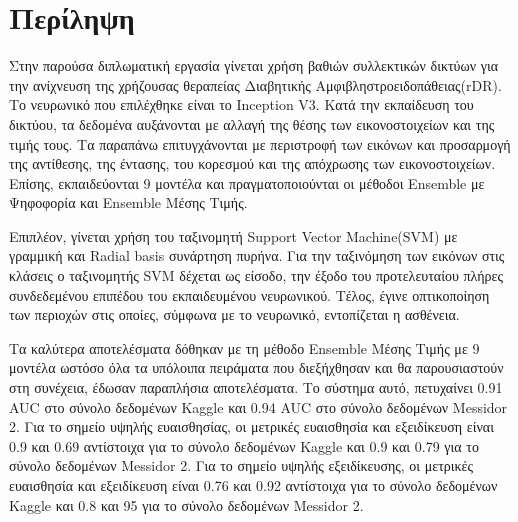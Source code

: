 \pagestyle{plain}

\chapter*{Περίληψη}
Στην παρούσα διπλωματική εργασία γίνεται χρήση βαθιών συλλεκτικών δικτύων για την ανίχνευση της χρήζουσας θεραπείας Διαβητικής Αμφιβληστροειδοπάθειας(rDR). Το νευρωνικό που επιλέχθηκε είναι το Inception V3. Κατά την εκπαίδευση του δικτύου, τα δεδομένα αυξάνονται με αλλαγή της θέσης των εικονοστοιχείων και της τιμής τους. Τα παραπάνω επιτυγχάνονται με περιστροφή των εικόνων και προσαρμογή της αντίθεσης, της έντασης, του κορεσμού και της απόχρωσης των εικονοστοιχείων. 
Επίσης, εκπαιδεύονται 9 μοντέλα και πραγματοποιούνται οι μέθοδοι Ensemble με Ψηφοφορία και Ensemble Μέσης Τιμής. 

Επιπλέον, γίνεται χρήση του ταξινομητή Support Vector Machine(SVM) με γραμμική και Radial basis συνάρτηση πυρήνα. Για την ταξινόμηση των εικόνων στις κλάσεις ο ταξινομητής SVM δέχεται ως είσοδο, την έξοδο του προτελευταίου πλήρες συνδεδεμένου επιπέδου του εκπαιδευμένου νευρωνικού. Τέλος, έγινε οπτικοποίηση των περιοχών στις οποίες, σύμφωνα με το νευρωνικό, εντοπίζεται η ασθένεια.

Τα καλύτερα αποτελέσματα δόθηκαν με τη μέθοδο Ensemble Μέσης Τιμής με 9 μοντέλα ωστόσο όλα τα υπόλοιπα πειράματα που διεξήχθησαν και θα παρουσιαστούν στη συνέχεια, έδωσαν παραπλήσια αποτελέσματα. Το σύστημα αυτό, πετυχαίνει 0.91 AUC στο σύνολο δεδομένων Kaggle και 0.94 AUC στο σύνολο δεδομένων Messidor 2. Για το σημείο υψηλής ευαισθησίας, οι μετρικές ευαισθησία και εξειδίκευση είναι 0.9 και 0.69 αντίστοιχα για το σύνολο δεδομένων Kaggle και 0.9 και 0.79 για το σύνολο δεδομένων Messidor 2. Για το σημείο υψηλής εξειδίκευσης, οι μετρικές ευαισθησία και εξειδίκευση  είναι 0.76 και 0.92 αντίστοιχα για το σύνολο δεδομένων Kaggle και 0.8 και 95 για το σύνολο δεδομένων Messidor 2.
